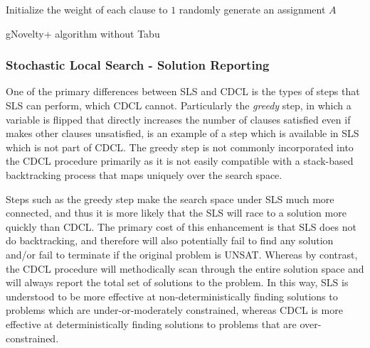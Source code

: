 \documentclass[
10pt, %
a4paper, %
oneside, %
headinclude,footinclude, %
BCOR5mm, %
]{scrartcl}
\begin{document}
\begin{algorithm}[H]
\SetAlgoLined
{}
Initialize the weight of each clause to $1$\;
randomly generate an assignment $A$\;
 \caption{gNovelty+ algorithm without Tabu}\label{algorithm3}
\end{algorithm}



\subsubsection{Stochastic Local Search - Solution Reporting}
One of the primary differences between SLS and CDCL is the types of steps that SLS can perform, which CDCL cannot.
Particularly the \textit{greedy} step, in which a variable is flipped that directly increases the number of clauses satisfied even if makes other clauses unsatisfied, is an example of a step which is available in SLS which is not part of CDCL.
The greedy step is not commonly incorporated into the CDCL procedure primarily as it is not easily compatible with a stack-based backtracking process that maps uniquely over the search space.

Steps such as the greedy step make the search space under SLS much more connected, and thus it is more likely that the SLS will race to a solution more quickly than CDCL.
The primary cost of this enhancement is that SLS does not do backtracking, and therefore will also potentially fail to find any solution and/or fail to terminate if the original problem is UNSAT.
Whereas by contrast, the CDCL procedure will methodically scan through the entire solution space and will always report the total set of solutions to the problem.
In this way, SLS is understood to be more effective at non-deterministically finding solutions to problems which are under-or-moderately constrained, whereas CDCL is more effective at deterministically finding solutions to problems that are over-constrained.
\end{document}
